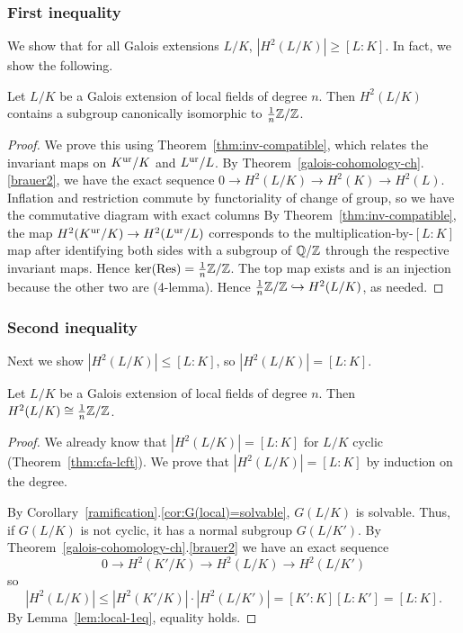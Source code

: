 \subsubsection{First inequality}
We show that for all Galois extensions $L/K$, $|H^2(L/K)|\ge [L:K]$. In fact, we show the following.
\begin{lem}
Let $L/K$ be a Galois extension of local fields of degree $n$. Then $H^2(L/K)$ contains a subgroup canonically isomorphic to $\frac{1}{n}\mathbb{Z}/\mathbb{Z}$.
\end{lem}
\begin{proof}
We prove this using Theorem~\ref{thm:inv-compatible}, which relates the invariant maps on $K^{\text{ur}}/K$ and $L^{\text{ur}}/L$. By Theorem~\ref{galois-cohomology-ch}.\ref{brauer2}, we have the exact sequence $0\to H^2(L/K)\to H^2(K)\to H^2(L)$. 
Inflation and restriction commute by functoriality of change of group, so we have the commutative diagram with exact columns
\eeq
By Theorem~\ref{thm:inv-compatible}, the map $H^2(K^{\text{ur}}/K)\to H^2(L^{\text{ur}}/L)$ corresponds to the multiplication-by-$[L:K]$ map after identifying both sides with a subgroup of $\mathbb{Q}/\mathbb{Z}$ through the respective invariant maps. Hence $\ker(\operatorname{Res})=\frac{1}{n}\mathbb{Z}/\mathbb{Z}$. The top map exists and is an injection because the other two are (4-lemma). Hence $\frac{1}{n}\mathbb{Z}/\mathbb{Z}\hookrightarrow H^2(L/K)$, as needed.
\end{proof}
\subsubsection{Second inequality}
Next we show $|H^2(L/K)|\le [L:K]$, so $|H^2(L/K)|=[L:K]$.
\begin{lem}
Let $L/K$ be a Galois extension of local fields of degree $n$. Then $H^2(L/K)\cong\frac{1}{n}\mathbb{Z}/\mathbb{Z}$.
\end{lem}
\begin{proof}
We already know that $|H^2(L/K)|=[L:K]$ for $L/K$ cyclic (Theorem~\ref{thm:cfa-lcft}). We prove that $|H^2(L/K)|=[L:K]$ by induction on the degree.

By Corollary~\ref{ramification}.\ref{cor:G(local)=solvable}, $G(L/K)$ is solvable. Thus, if $G(L/K)$ is not cyclic, it has a normal subgroup $G(L/K')$. By Theorem~\ref{galois-cohomology-ch}.\ref{brauer2} we have an exact sequence
\[
0\to H^2(K'/K)\to H^2(L/K)\to H^2(L/K')
\]
so
\[
|H^2(L/K)|\le |H^2(K'/K)|\cdot |H^2(L/K')|=[K':K][L:K']=[L:K].
\]
By Lemma~\ref{lem:local-1eq}, equality holds.
\end{proof}
